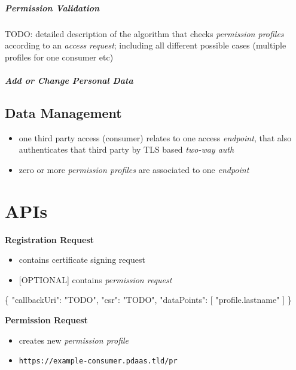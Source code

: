 \documentclass[12pt,english,a4paper,titlepage,cleardoublepage=empty,dottedtoc]{report}
\newenvironment{Shaded}{}{}
\newcommand{\DataTypeTok}[1]{\textcolor[rgb]{0.56,0.13,0.00}{{#1}}}
\newcommand{\StringTok}[1]{\textcolor[rgb]{0.25,0.44,0.63}{{#1}}}
\newcommand{\OtherTok}[1]{\textcolor[rgb]{0.00,0.44,0.13}{{#1}}}
\newcommand{\FunctionTok}[1]{\textcolor[rgb]{0.02,0.16,0.49}{{#1}}}
\providecommand{\tightlist}{%
  \setlength{\itemsep}{0pt}\setlength{\parskip}{0pt}}
\begin{document}
\subparagraph{Permission Validation}\label{permission-validation}

TODO: detailed description of the algorithm that checks \emph{permission
profiles} according to an \emph{access request}; including all different
possible cases (multiple profiles for one consumer etc)

\subparagraph{Add or Change Personal
Data}\label{add-or-change-personal-data}

\subsection{Data Management}\label{data-management}

\begin{itemize}
\tightlist
\item
  one third party access (consumer) relates to one access
  \emph{endpoint}, that also authenticates that third party by TLS based
  \emph{two-way auth}
\item
  zero or more \emph{permission profiles} are associated to one
  \emph{endpoint}
\end{itemize}

\section{APIs}\label{apis}

\textbf{Registration Request}

\begin{itemize}
\tightlist
\item
  contains certificate signing request
\item
  {[}OPTIONAL{]} contains \emph{permission request}
\end{itemize}

\begin{Shaded}
\begin{Highlighting}[]
\FunctionTok{\{}
    \DataTypeTok{"callbackUri"}\FunctionTok{:} \StringTok{"TODO"}\FunctionTok{,}
    \DataTypeTok{"csr"}\FunctionTok{:} \StringTok{"TODO"}\FunctionTok{,}
    \DataTypeTok{"dataPoints"}\FunctionTok{:} \OtherTok{[}
        \StringTok{"profile.lastname"}
    \OtherTok{]}
\FunctionTok{\}}
\end{Highlighting}
\end{Shaded}

\textbf{Permission Request}

\begin{itemize}
\tightlist
\item
  creates new \emph{permission profile}
\item
  \texttt{https://example-consumer.pdaas.tld/pr}
\end{itemize}
\end{document}
